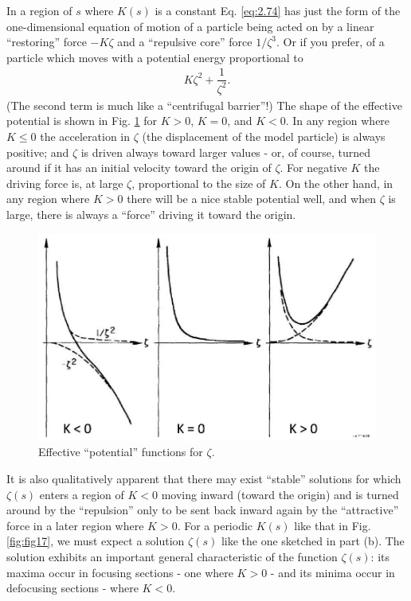 In a region of $s$ where $K(s)$ is a constant Eq. \eqref{eq:2.74} has just the form of the
one-dimensional equation of motion of a particle being acted on by a linear “restoring” force $-K\zeta$ and a “repulsive core” force $1/\zeta^3$. Or if you prefer, of a particle which moves with a potential energy proportional to
\begin{align*}
	K \zeta^2 + \dfrac{1}{\zeta^2}.
\end{align*}
(The second term is much like a “centrifugal barrier”!) The shape of the effective potential is shown in Fig. \ref{fig:fig16} for $K > 0$, $K = 0$, and $K < 0$. In any region where $K \leq 0$ the acceleration in $\zeta$ (the displacement of the model particle) is always positive; and $\zeta$ is driven always toward larger values - or, of course, turned around
if it has an initial velocity toward the origin of $\zeta$. For negative $K$ the driving force
is, at large $\zeta$, proportional to the size of $K$. On the other hand, in any region
where $K > 0$ there will be a nice stable potential well, and when $\zeta$ is large, there
is always a “force” driving it toward the origin.

\begin{figure}[!htb]
	\centering
	\includegraphics[width=0.8\linewidth]{./Figuras/fig16.jpeg}
	\caption{Effective ``potential'' functions for $\zeta$.}
	\label{fig:fig16}
\end{figure}

It is also qualitatively apparent that there may exist ``stable''  solutions for which $\zeta(s)$ enters a region of $K < 0$ moving inward (toward the origin) and is turned around by the ``repulsion'' only to be sent back inward again by the ``attractive'' force in a later region where $K > 0$. For a periodic $K(s)$ like that in Fig. \ref{fig:fig17}, we must expect a solution $\zeta(s)$ like the one sketched in part (b). The solution exhibits an important general characteristic of the function $\zeta(s)$: its maxima occur in focusing sections - one where $K > 0$ - and its minima occur in defocusing sections - where $K < 0$.

